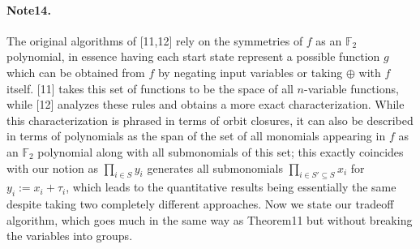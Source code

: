 \documentclass[10pt,a4paper]{article}
\begin{document}
\paragraph{Note14.} The original algorithms of [11,12] rely on the symmetries of $f$ as an $\mathbb F_2$ polynomial, in essence having each start state represent a possible function $g$ which can be obtained from $f$ by negating input variables or taking $\oplus$ with $f$ itself. [11] takes this set of functions to be the space of all $n$-variable functions, while [12] analyzes these rules and obtains a more exact characterization. While this characterization is phrased in terms of orbit closures, it can also be described in terms of polynomials as the span of the set of all monomials appearing in $f$ as an $\mathbb F_2$ polynomial along with all submonomials of this set; this exactly coincides with our notion as $\prod_{i\in S}y_i$ generates all submonomials $\prod_{i\in S'\subseteq S}x_i$ for $y_i:=x_i+\tau_i$, which leads to the quantitative results being essentially the same despite taking two completely different approaches.
Now we state our tradeoff algorithm, which goes much in the same way as Theorem11 but without breaking the variables into groups.
\end{document}
